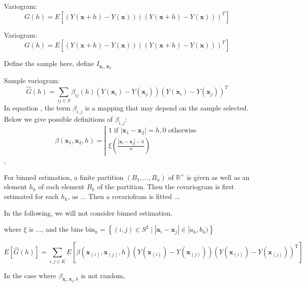 \documentclass[12pt]{article}
\theoremstyle{definition}
\theoremstyle{remark}
\newcommand{\paramnuisance}{\xi}
\newcommand{\Sampleindex}{K}
\newcommand{\Sample}{S}
\newcommand{\position}{\mathbf{x}}
\newcommand{\Signal}{Y}
\begin{document}
Variogram:
\begin{equation}
    G(h)=E[(\Signal(\position+h)-\Signal(\position))((\Signal(\position+h)-\Signal(\position)))^{T}]
\end{equation}


Variogram:
\begin{equation}
    G(h)=E[(Y(\mathbf{x}+h)-Y(\mathbf{x}))((Y(\mathbf{x}+h)-Y(\mathbf{x})))^{T}]
\end{equation}

{\color{red}Define the sample here, define $I_{\position_1,\position_2}$}

Sample variogram:
\begin{equation} \label{somelabel}
    \hat{G}(h)=\sum_{ij\in\Sample}{\beta_{ij}(h)(Y(\mathbf{x}_{i})-Y(\mathbf{x}_{j}))(Y(\mathbf{x}_{i})-Y(\mathbf{x}_{j}))^{T}}
\end{equation}
In equation , the term $\beta_{i,j}$ is a mapping that may depend on the sample selected.
Below we give possible definitions of $\beta_{i,j}$:
\begin{equation}
    \beta(\position_1,\position_2,h)=
    \left|\begin{array}{l}
    1 \text{ if } |\mathbf{x}_1-\mathbf{x}_2|=h, 0 \text{ otherwise}\\
    \paramnuisance(\frac{|\mathbf{x}_{i}-\mathbf{x}_{j}|-h}{\alpha})
    \end{array}\right.
\end{equation},

For binned estimation, a finite partition $(B_1,\ldots,B_n)$ of $\mathbb{R}^+$ is given as well as an element $h_k$ of each element $B_k$ of the partition. 
Then the covariogram is first estimated for each $h_k$, as 
...
Then a covariofram is fitted 
...

In the following, we will not consider binned estimation.


where {\color{red} $\paramnuisance$ is ..., and the bins $\mathrm{bin}_h=\left\{(i,j)\in\Sample^2\mid \left|\position_i-\position_j\right|\in [a_h,b_h)\right\}$}

\begin{equation}
    E[\hat{G}(h)]=\sum_{i,j\in\Sampleindex}E\left[ \beta(\position_{(i)},\position_{(j)},h)(Y(\mathbf{x}_{(i)})-Y(\mathbf{x}_{(j)}))(Y(\mathbf{x}_{(i)})-Y(\mathbf{x}_{(j)}))^{\mathrm{T}}\right]
\end{equation}


In the case where $\beta_{\position_i,\position_j,h}$ is not random,
\end{document}

